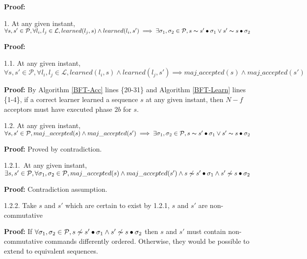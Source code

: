\textbf{Proof:} \par
\parbox{\linewidth}{\strut1. At any given instant, $\forall s,s' \in \mathcal{P}, \forall l_i,l_j \in \mathcal{L}, learned(l_j,s) \land learned(l_i,s') \implies \exists \sigma_1,\sigma_2 \in \mathcal{P}, s \thicksim s' \bullet \sigma_1 \lor s' \thicksim s \bullet \sigma_2$}  \par
\indent\indent\parbox{\linewidth}{\strut\textbf{Proof:} }\par
\indent\indent\indent\parbox{\linewidth-\algorithmicindent*3}{\strut1.1. At any given instant, $\forall s,s' \in \mathcal{P}, \forall l_i,l_j \in \mathcal{L}, learned(l_i,s) \land learned(l_j,s') \implies maj\_accepted(s) \land maj\_accepted(s')$} \par
\indent\indent\indent\indent\parbox{\linewidth-\algorithmicindent*4}{\strut\textbf{Proof:} By Algorithm \ref{BFT-Acc} lines \{20-31\} and Algorithm \ref{BFT-Learn} lines \{1-4\}, if a correct learner learned a sequence $s$ at any given instant, then $N-f$ acceptors must have executed phase $2b$ for $s$.}\par
\indent\indent\indent\parbox{\linewidth-\algorithmicindent*3}{\strut1.2. At any given instant, $\forall s,s' \in \mathcal{P}, maj\_accepted(s) \land maj\_accepted(s') \implies \exists \sigma_1,\sigma_2 \in \mathcal{P}, s \thicksim s' \bullet \sigma_1 \lor s' \thicksim s \bullet \sigma_2$}\par
\indent\indent\indent\indent\parbox{\linewidth}{\strut\textbf{Proof:} Proved by contradiction.}\par
\indent\indent\indent\indent\indent\parbox{\linewidth-\algorithmicindent*5}{\strut1.2.1.~At any given instant, $\exists s,s' \in \mathcal{P}, \forall \sigma_1,\sigma_2 \in \mathcal{P}, maj\_accepted(s) \land maj\_accepted(s') \wedge s \not\thicksim s' \bullet \sigma_1 \land s' \not\thicksim s \bullet \sigma_2$} \par
\indent\indent\indent\indent\indent\indent\parbox{\linewidth}{\strut\textbf{Proof:} Contradiction assumption.}\par
\indent\indent\indent\indent\indent\parbox{\linewidth-\algorithmicindent*5}{\strut1.2.2. Take $s$ and $s'$ which are certain to exist by 1.2.1, $s$ and $s'$ are non-commutative }\par
\indent\indent\indent\indent\indent\indent\parbox{\linewidth-\algorithmicindent*6}{\strut\textbf{Proof:} If $\forall \sigma_1,\sigma_2 \in \mathcal{P}, s \not\thicksim s' \bullet \sigma_1 \land s' \not\thicksim s \bullet \sigma_2$ then $s$ and $s'$ must contain non-commutative commands differently ordered. Otherwise, they would be possible to extend to equivalent sequences.}\par
